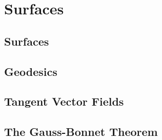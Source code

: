 \documentclass[10pt]{article}
\begin{document}


\section{Surfaces}

\subsection{Surfaces}



\subsection{Geodesics}



\subsection{Tangent Vector Fields}



\subsection{The Gauss-Bonnet Theorem}


\end{document}
